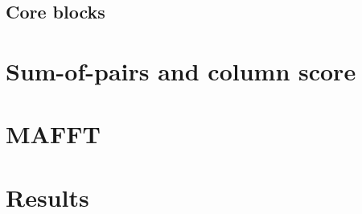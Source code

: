 \subsection{Core blocks}




\section{Sum-of-pairs and column score}

\section{MAFFT}

\section{Results}
